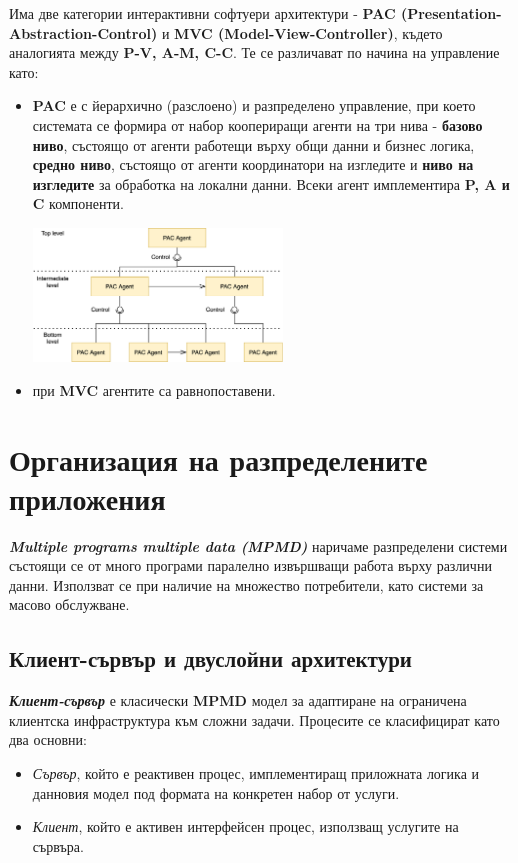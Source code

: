 \documentclass[fleqn,12pt]{article}
\begin{document}
Има две категории интерактивни софтуери архитектури - \textbf{PAC (Presentation-Abstraction-Control)} и \textbf{MVC (Model-View-Controller)}, където аналогията между \textbf{P-V, A-M, C-C}.
Те се различават по начина на управление като:
\begin{itemize}
    \item \textbf{PAC} е с йерархично (разслоено) и разпределено управление, при което системата се формира от набор коопериращи агенти на три нива - \textbf{базово ниво}, състоящо от агенти работещи върху общи данни и бизнес логика, \textbf{средно ниво}, състоящо от агенти координатори на изгледите и \textbf{ниво на изгледите} за обработка на локални данни.
    Всеки агент имплементира \textbf{P, A и C} компоненти.
    \begin{center} \includegraphics[width=250px]{pac.png} \end{center}
    \item при \textbf{MVC} агентите са равнопоставени.
\end{itemize}

\section{Организация на разпределените приложения}

\textbf{\textit{Multiple programs multiple data (MPMD)}} наричаме разпределени системи състоящи се от много програми паралелно извършващи работа върху различни данни.
Използват се при наличие на множество потребители, като системи за масово обслужване.

\subsection{Клиент-сървър и двуслойни архитектури}

\textbf{\textit{Клиент-сървър}} е класически \textbf{MPMD} модел за адаптиране на ограничена клиентска инфраструктура към сложни задачи.
Процесите се класифицират като два основни:
\begin{itemize}
    \item \textit{Сървър}, който е реактивен процес, имплементиращ приложната логика и данновия модел под формата на конкретен набор от услуги.
    \item \textit{Клиент}, който е активен интерфейсен процес, използващ услугите на сървъра.
\end{itemize}
\end{document}
